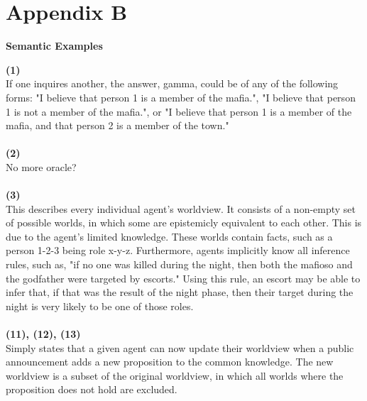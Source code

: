 \section*{Appendix B}\label{app:B}
\begin{center}
	\textbf{Semantic Examples}
\end{center}
\textbf{(1)} \\
If one inquires another, the answer, gamma, could be of any of the 
following forms: "I believe that person 1 is a member of the mafia.", "I believe 
that person 1 is not a member of the mafia.", or "I believe that person 1 is a 
member of the mafia, and that person 2 is a member of the town."  \\ \\
\textbf{(2)} \\
No more oracle? \\ \\
\textbf{(3)} \\
This describes every individual agent's worldview. It consists of a 
non-empty set of possible worlds, in which some are epistemicly equivalent to 
each other. This is due to the agent's limited knowledge. These worlds contain facts, 
such as a person 1-2-3 being role x-y-z. Furthermore, agents implicitly know 
all inference rules, such as, "if no one was killed during the night, then both 
the mafioso and the godfather were targeted by escorts." Using this rule, an 
escort may be able to infer that, if that was the result of the night phase, 
then their target during the night is very likely to be one of those roles.  \\ 
\\
\textbf{(11), (12), (13)} \\
Simply states that a given agent can now update their worldview when a public announcement adds a new proposition to the common knowledge. The new worldview is a subset of the original worldview, in which 
all worlds where the proposition does not hold are excluded. 
